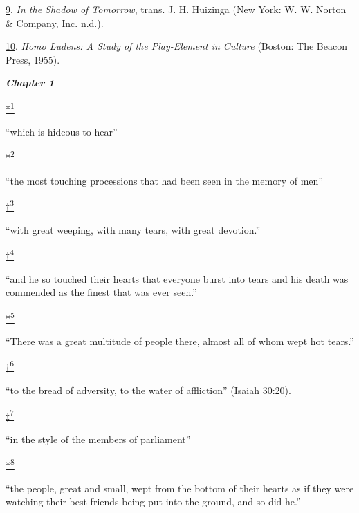 \protect\hypertarget{23_NOTES.xhtmlux5cux23id_2232}{\protect\hyperlink{05_TRANSLATOR_S_INTRODUCTION.xhtmlux5cux23id_2231}{9}}.
\emph{In the Shadow of Tomorrow}, trans. J. H. Huizinga (New York: W. W.
Norton \& Company, Inc. n.d.).

\protect\hypertarget{23_NOTES.xhtmlux5cux23id_2230}{\protect\hyperlink{05_TRANSLATOR_S_INTRODUCTION.xhtmlux5cux23id_2229}{10}}.
\emph{Homo Ludens: A Study of the Play-Element in Culture} (Boston: The
Beacon Press, 1955).

\textbf{\emph{Chapter 1}}

\protect\hypertarget{23_NOTES.xhtmlux5cux23id_2304}{\protect\hyperlink{08_Chapter_One__THE_PASSIONATE_INTE.xhtmlux5cux23id_2303}{*\textsuperscript{1}}}
``which is hideous to hear''

\protect\hypertarget{23_NOTES.xhtmlux5cux23id_2251}{\protect\hyperlink{08_Chapter_One__THE_PASSIONATE_INTE.xhtmlux5cux23id_2252}{*\textsuperscript{2}}}
``the most touching processions that had been seen in the memory of
men''

\protect\hypertarget{23_NOTES.xhtmlux5cux23id_2249}{\protect\hyperlink{08_Chapter_One__THE_PASSIONATE_INTE.xhtmlux5cux23id_2250}{†\textsuperscript{3}}}
``with great weeping, with many tears, with great devotion.''

\protect\hypertarget{23_NOTES.xhtmlux5cux23id_2255}{\protect\hyperlink{08_Chapter_One__THE_PASSIONATE_INTE.xhtmlux5cux23id_2256}{‡\textsuperscript{4}}}
``and he so touched their hearts that everyone burst into tears and his
death was commended as the finest that was ever seen.''

\protect\hypertarget{23_NOTES.xhtmlux5cux23id_2253}{\protect\hyperlink{08_Chapter_One__THE_PASSIONATE_INTE.xhtmlux5cux23id_2254}{*\textsuperscript{5}}}
``There was a great multitude of people there, almost all of whom wept
hot tears.''

\protect\hypertarget{23_NOTES.xhtmlux5cux23id_2258}{\protect\hyperlink{08_Chapter_One__THE_PASSIONATE_INTE.xhtmlux5cux23id_2257}{†\textsuperscript{6}}}
``to the bread of adversity, to the water of affliction'' (Isaiah
30:20).

\protect\hypertarget{23_NOTES.xhtmlux5cux23id_2261}{\protect\hyperlink{08_Chapter_One__THE_PASSIONATE_INTE.xhtmlux5cux23id_2259}{‡\textsuperscript{7}}}
``in the style of the members of parliament''

\protect\hypertarget{23_NOTES.xhtmlux5cux23id_2263}{\protect\hyperlink{08_Chapter_One__THE_PASSIONATE_INTE.xhtmlux5cux23id_2260}{*\textsuperscript{8}}}
``the people, great and small, wept from the bottom of their hearts as
if they were watching their best friends being put into the ground, and
so did he.''

